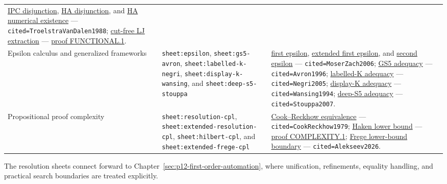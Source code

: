 \begin{landscape}
\begin{longtable}{@{}p{.82in}p{2.05in}p{4.95in}@{}}
\hyperref[thm:p07-ipc-disjunction-property]{IPC disjunction},
\hyperref[thm:p07-ha-disjunction-property]{HA disjunction}, and
\hyperref[thm:p07-ha-numerical-existence]{HA numerical existence}
--- \texttt{cited=TroelstraVanDalen1988};
\hyperref[thm:p07-lj-disjunction-last-rule]{cut-free LJ extraction}
--- \hyperref[annex:p7.functional.1]{proof FUNCTIONAL.1}. \\
\addlinespace
Epsilon calculus and generalized frameworks &
\texttt{sheet:epsilon}, \texttt{sheet:gs5-avron},
\texttt{sheet:labelled-k-negri}, \texttt{sheet:display-k-wansing}, and
\texttt{sheet:deep-s5-stouppa} &
\hyperref[thm:p07-first-epsilon]{first epsilon},
\hyperref[thm:p07-extended-first-epsilon]{extended first epsilon}, and
\hyperref[thm:p07-second-epsilon]{second epsilon}
--- \texttt{cited=MoserZach2006};
\hyperref[thm:p07-gs5-adequacy]{GS5 adequacy}
--- \texttt{cited=Avron1996};
\hyperref[thm:p07-labelled-k-adequacy]{labelled-K adequacy}
--- \texttt{cited=Negri2005};
\hyperref[thm:p07-display-k-adequacy]{display-K adequacy}
--- \texttt{cited=Wansing1994};
\hyperref[thm:p07-deep-s5-adequacy]{deep-S5 adequacy}
--- \texttt{cited=Stouppa2007}. \\
\addlinespace
Propositional proof complexity &
\texttt{sheet:resolution-cpl}, \texttt{sheet:extended-resolution-cpl},
\texttt{sheet:hilbert-cpl}, and \texttt{sheet:extended-frege-cpl} &
\hyperref[thm:p07-cook-reckhow-np-conp]{Cook--Reckhow equivalence}
--- \texttt{cited=CookReckhow1979};
\hyperref[thm:p07-haken-resolution-lower-bound]{Haken lower bound}
--- \hyperref[annex:p7.complexity.1]{proof COMPLEXITY.1};
\hyperref[thm:p07-frege-lower-bound-boundary]{Frege lower-bound boundary}
--- \texttt{cited=Alekseev2026}. \\
\bottomrule
\end{longtable}
\endgroup
\end{landscape}
\endgroup

The resolution sheets connect forward to
Chapter~\ref{sec:p12-first-order-automation}, where unification, refinements,
equality handling, and practical search boundaries are treated explicitly.
